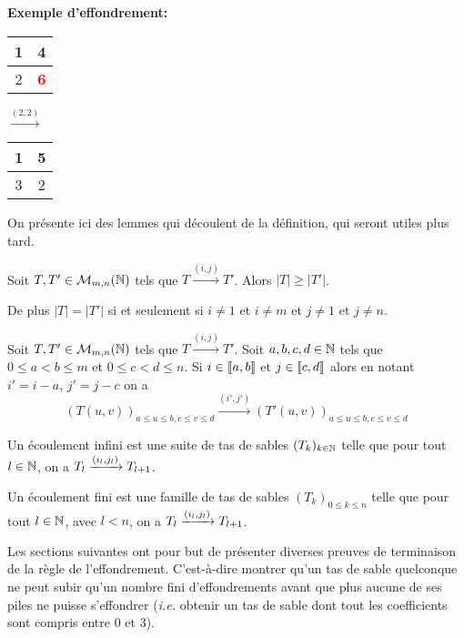 \textbf{Exemple d'effondrement:}
\begin{center}
\begin{tabular}{|c|c|}
\hline
1&4\\
\hline
2&\textbf{\textcolor{red}{6}}\\
\hline
\end{tabular}
\quad
$\xrightarrow{(2,2)}$
\quad
\begin{tabular}{|c|c|}
\hline
1&5\\
\hline
3&2\\
\hline
\end{tabular}
\end{center}

On présente ici des lemmes qui découlent de la définition, qui seront utiles plus tard.
\begin{lem}
\label{lemmedecroissance}
Soit $T,T'\in\mathcal{M}_{m,n}(\mathbb{N})$ tels que $T\xrightarrow{(i,j)}T'$. Alors $|T|\geq |T'|$. 

De plus $|T|=|T'|$ si et seulement si $i\neq 1$ et $i\neq m$ et $j\neq 1$ et $j\neq n$.
\end{lem}




\begin{lem}
\label{lemmeextraction}
Soit $T,T'\in\mathcal{M}_{m,n}(\mathbb{N})$ tels que $T\xrightarrow{(i,j)}T'$. Soit $a,b,c,d\in\mathbb{N}$ tels que $0\leq a<b\leq m$ et $0\leq c<d\leq n$. Si $i\in \llbracket a,b\rrbracket$ et $j\in\llbracket c,d\rrbracket$ alors en notant $i'=i-a$, $j'=j-c$ on a 
$$(T(u,v))_{a\leq u\leq b, c\leq v\leq d} \xrightarrow{(i',j')} (T'(u,v))_{a\leq u\leq b, c\leq v\leq d}$$
\end{lem}

\begin{definition}
Un écoulement infini est une suite de tas de sables $(T_k)_{k\in \mathbb{N}}$ telle que pour tout $l\in\mathbb{N}$, on a $T_l\xrightarrow{(i_{l},j_{l})}T_{l+1}$.

Un écoulement fini est une famille de tas de sables $(T_k)_{0\leq k\leq n}$ telle que pour tout $l\in\mathbb{N}$, avec $l<n$, on a $T_l\xrightarrow{(i_{l},j_{l})}T_{l+1}$.
\end{definition}

Les sections suivantes ont pour but de présenter diverses preuves de terminaison de la règle de l'effondrement. C'est-à-dire montrer qu'un tas de sable quelconque ne peut subir qu'un nombre fini d'effondrements avant que plus aucune de ses piles ne puisse s'effondrer (\textit{i.e.} obtenir un tas de sable dont tout les coefficients sont compris entre 0 et 3).


